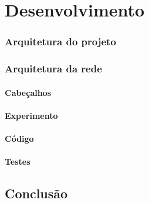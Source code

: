 \documentclass[12pt,
openright, 
oneside,
a4paper,
brazil]{facom-ufu-abntex2}
\theoremstyle{definition}
\begin{document}
\chapter{Desenvolvimento}
 
\subsection{Arquitetura do projeto}
\subsection{Arquitetura da rede}
\subsubsection{Cabeçalhos}
\subsubsection{Experimento}
\subsubsection{Código}
\subsubsection{Testes}

\section{Conclusão}





\end{document}
